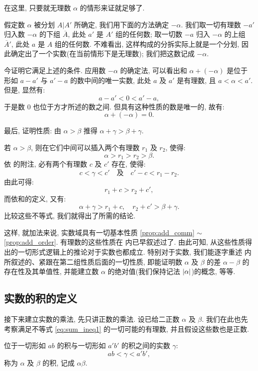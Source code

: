 在这里, 只要就无理数 $\alpha$ 的情形来证就足够了.

假定数 $\alpha$ 被分划 $A|A'$ 所确定, 我们用下面的方法确定 $-\alpha$.
我们取一切有理数 $-a'$ 归入数 $-\alpha$ 的下组 $\overline{A}$, 此处 $a'$ 是 $A'$ 组的任何数;
取一切数 $-a$ 归入 $-\alpha$ 的上组 $\overline{A}'$, 此处 $a$ 是 $A$ 组的任何数.
不难看出, 这样构成的分拆实际上就是一个分划, 因此确定出了一个实数(在当前情形下是无理数);
我们把这数记成 $-\alpha$.

今证明它满足上述的条件.
应用数 $-\alpha$ 的确定法, 可以看出和 $\alpha + (-\alpha)$ 是位于形如 $a - a'$ 与 $a' - a$ 的数中间的唯一实数,
此处 $a$ 及 $a'$ 是有理数, 且 $a < \alpha < a'$.
但是, 显然有:
$$ a - a' < 0 < a' - a, $$
于是数 $0$ 也位于方才所述的数之间.
但具有这种性质的数是唯一的, 故有:
$$ \alpha + (-\alpha) = 0. $$

最后, 证明性质:
{\kaishu
    \label{prop:add_order} 由 $\alpha > \beta$ 推得 $\alpha + \gamma > \beta + \gamma$.
}

若 $\alpha > \beta$, 则在它们中间可以插入两个有理数 $r_1$ 及 $r_2$, 使得:
$$ \alpha > r_1 > r_2 > \beta. $$
依  的附注, 必有两个有理数 $c$ 及 $c'$ 存在, 使得:
$$ c < \gamma < c' \quad \text{及} \quad c' - c < r_1 - r_2. $$
由此可得:
$$ r_1 + c > r_2 + c', $$
而依和的定义, 又有:
$$ \alpha + \gamma > r_1 + c, \quad r_2 + c' > \beta + \gamma. $$
比较这些不等式, 我们就得出了所需的结论.

这样, 就加法来说, 实数域具有一切基本性质 \ref{prop:add_comm} $\sim$ \ref{prop:add_order}.
有理数的这些性质在  内已早叙述过了.
由此可知, 从这些性质得出的一切形式逻辑上的推论对于实数也都成立.
特别对于实数, 我们能逐字重述  内所叙述的、紧跟在第二组性质后面的一切性质,
即能证明数 $\alpha$ 及 $\beta$ 的差 $\alpha - \beta$ 的存在性及其单值性,
并能建立数 $\alpha$ 的绝对值(我们保持记法 $\left| \alpha \right|$)的概念, 等等.

\subsection{实数的积的定义}\label{subsec:14}

接下来建立实数的乘法, 先只讲正数的乘法.
设已给二正数 $\alpha$ 及 $\beta$.
我们在此也先考察满足不等式 \eqref{eq:sum_ineq1} 的一切可能的有理数,
并且假设这些数也是正数.

{\kaishu
位于一切形如 $ab$ 的积与一切形如 $a'b'$ 的积之间的实数 $\gamma$:
\begin{equation}\label{eq:prod_ineq}
ab < \gamma < a'b',
\end{equation}
称为 $\alpha$ 及 $\beta$ 的积, 记成 $\alpha\beta$.
}

